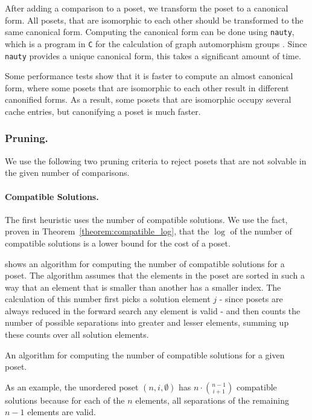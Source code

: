 \documentclass[twoside,leqno,twocolumn]{article}
\begin{document}
After adding a comparison to a poset, we transform the poset to a canonical form.
All posets, that are isomorphic to each other should be transformed to the same canonical form.
Computing the canonical form can be done using \texttt{nauty}, which is a program in \texttt{C} for the calculation of graph automorphism groups \cite[Practical Graph Isomorphism]{MCKAY201494}.
Since \texttt{nauty} provides a unique canonical form, this takes a significant amount of time.

Some performance tests show that it is faster to compute an almost canonical form, where some posets that are isomorphic to each other result in different canonified forms.
As a result, some posets that are isomorphic occupy several cache entries, but canonifying a poset is much faster.

\subsubsection{Pruning.}
We use the following two pruning criteria to reject posets that are not solvable in the given number of comparisons.

\paragraph{Compatible Solutions.}
The first heuristic uses the number of compatible solutions.
We use the fact, proven in Theorem~\ref{theorem:compatible_log}, that the $\log$ of the number of compatible solutions is a lower bound for the cost of a poset.

 shows an algorithm for computing the number of compatible solutions for a poset.
The algorithm assumes that the elements in the poset are sorted in such a way that an element that is smaller than another has a smaller index.
The calculation of this number first picks a solution element $j$ - since posets are always reduced in the forward search any element is valid - and then counts the number of possible separations into greater and lesser elements, summing up these counts over all solution elements.

\begin{algorithm}[t]
  \centering
  
  \caption{An algorithm for computing the number of compatible solutions for a given poset.}
  \label{algo:compatible_solutions}
\end{algorithm}

As an example, the unordered poset $(n,i,\emptyset)$ has $n \cdot \binom{n - 1}{i + 1}$ compatible solutions because for each of the $n$ elements, all separations of the remaining $n - 1$ elements are valid.
\end{document}
